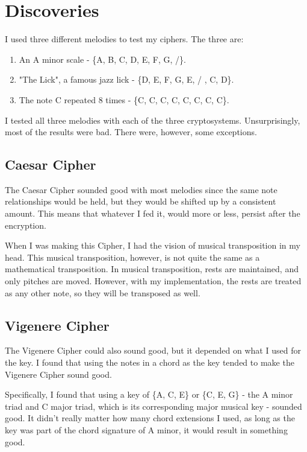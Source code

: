 \documentclass[14pt]{article}
\begin{document}
	\section{Discoveries}
        I used three different melodies to test my ciphers. The three are:
        \begin{enumerate}
            \item An A minor scale - \{A, B, C, D, E, F, G, /\}.
            \item "The Lick", a famous jazz lick - \{D, E, F, G, E, / , C, D\}.
            \item The note C repeated 8 times - \{C, C, C, C, C, C, C, C\}.
        \end{enumerate}

        I tested all three melodies with each of the three cryptosystems. Unsurprisingly, most of the results were bad. There were, however, some exceptions.

        \subsection{Caesar Cipher}
        The Caesar Cipher sounded good with most melodies since the same note relationships would be held, but they would be shifted up by a consistent amount. This means that whatever I fed it, would more or less, persist after the encryption.

        When I was making this Cipher, I had the vision of musical transposition in my head. This musical transposition, however, is not quite the same as a mathematical transposition. In musical transposition, rests are maintained, and only pitches are moved. However, with my implementation, the rests are treated as any other note, so they will be transposed as well.

        \subsection{Vigenere Cipher}
        The Vigenere Cipher could also sound good, but it depended on what I used for the key. I found that using the notes in a chord as the key tended to make the Vigenere Cipher sound good.

        Specifically, I found that using a key of \{A, C, E\} or \{C, E, G\} - the A minor triad and C major triad, which is its corresponding major musical key - sounded good. It didn't really matter how many chord extensions I used, as long as the key was part of the chord signature of A minor, it would result in something good.
\end{document}
